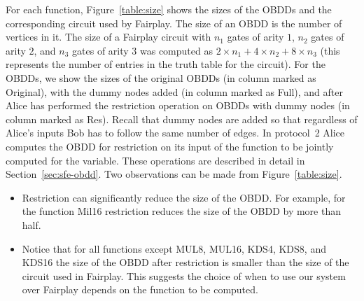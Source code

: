 For each function, Figure~\ref{table:size} shows the sizes of the
OBDDs and the corresponding circuit used by Fairplay. The size of an
OBDD is the number of vertices in it. The size of a Fairplay circuit
with $n_1$ gates of arity $1$, $n_2$ gates of arity $2$, and $n_3$
gates of arity $3$ was computed as $2 \times n_1 + 4 \times n_2 + 8
\times n_3$ (this represents the number of entries in the truth table
for the circuit).  For the OBDDs, we show the sizes of the original
OBDDs (in column marked as {\sf Original}), with the dummy nodes added
(in column marked as {\sf Full}), and after Alice has performed the
restriction operation on OBDDs with dummy nodes (in column marked as
{\sf Res}). Recall that dummy nodes are added so that regardless of
Alice's inputs Bob has to follow the same number of edges. In
protocol~2 Alice computes the OBDD for restriction on its input of the
function to be jointly computed for the variable. These operations are
described in detail in Section~\ref{sec:sfe-obdd}. Two observations
can be made from Figure~\ref{table:size}.
\begin{itemize}
\item Restriction can significantly reduce the size of
the OBDD. For example, for the function Mil16  restriction
reduces the size of the OBDD by more than half. 

\item Notice that for all functions except MUL8, MUL16, KDS4, KDS8, and KDS16 the
size of the OBDD after restriction is smaller than the size of the
circuit used in Fairplay. This suggests the choice of when to use our
system over Fairplay depends on the function to be computed. 
\end{itemize}




